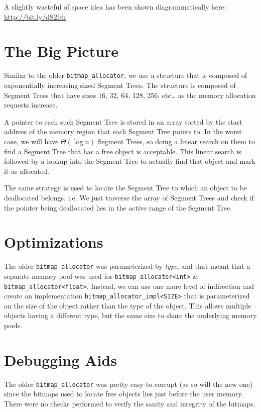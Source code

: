 \documentclass{article}
\begin{document}
A slightly wasteful of space idea has been shown diagrammatically
here:\\
\url{http://bit.ly/dS2lrh}

\section{The Big Picture}

Similar to the older \texttt{bitmap\_allocator}, we use a structure
that is composed of exponentially increasing sized Segment Trees. The
structure is composed of Segment Trees that have sizes 16, 32, 64,
128, 256, etc\ldots{} as the memory allocation requests increase.

A pointer to each such Segment Tree is stored in an array sorted by
the start address of the memory region that each Segment Tree points
to. In the worst case, we will have $\Theta(\log{n})$ Segment Trees,
so doing a linear search on them to find a Segment Tree that has a
free object is acceptable. This linear search is followed by a lookup
into the Segment Tree to actually find that object and mark it as
allocated.

The same strategy is used to locate the Segment Tree to which an
object to be deallocated belongs. i.e. We just traverse the array of
Segment Trees and check if the pointer being deallocated lies in the
active range of the Segment Tree.

\section{Optimizations}

The older \texttt{bitmap\_allocator} was parameterized by
\textit{type}, and that meant that a separate memory pool was used for
\texttt{bitmap\_allocator<int>} \&
\texttt{bitmap\_allocator<float>}. Instead, we can use one more level
of indirection and create an implementation
\texttt{bitmap\_allocator\_impl<SIZE>} that is parameterized on the
size of the object rather than the type of the object. This allows
multiple objects having a different type, but the same size to share
the underlying memory pools.

\section{Debugging Aids}

The older \texttt{bitmap\_allocator} was pretty easy to corrupt (as so
will the new one) since the bitmaps used to locate free objects lies
just before the user memory. There were no checks performed to verify
the sanity and integrity of the bitmaps.
\end{document}
